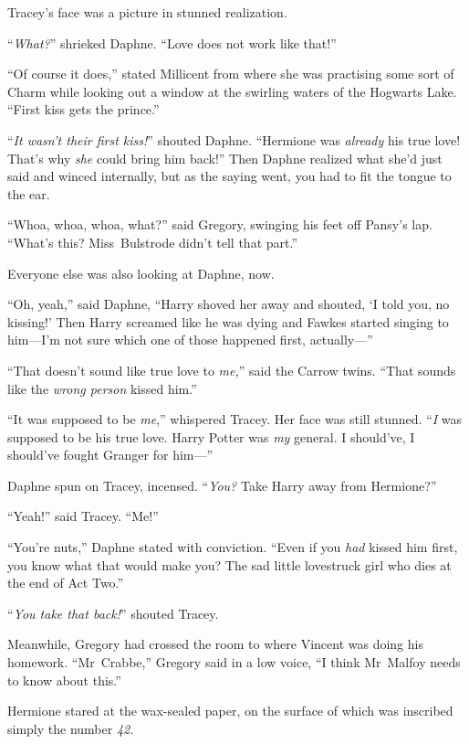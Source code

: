 Tracey’s face was a picture in stunned realization.

“\emph{What?}” shrieked Daphne. “Love does not work like that!”

“Of course it does,” stated Millicent from where she was practising some sort of Charm while looking out a window at the swirling waters of the Hogwarts Lake. “First kiss gets the prince.”

“\emph{It wasn’t their first kiss!}” shouted Daphne. “Hermione was \emph{already} his true love! That’s why \emph{she} could bring him back!” Then Daphne realized what she’d just said and winced internally, but as the saying went, you had to fit the tongue to the ear.

“Whoa, whoa, whoa, what?” said Gregory, swinging his feet off Pansy’s lap. “What’s this? Miss~Bulstrode didn’t tell that part.”

Everyone else was also looking at Daphne, now.

“Oh, yeah,” said Daphne, “Harry shoved her away and shouted, ‘I told you, no kissing!’ Then Harry screamed like he was dying and Fawkes started singing to him—I’m not sure which one of those happened first, actually—”

“That doesn’t sound like true love to \emph{me,}” said the Carrow twins. “That sounds like the \emph{wrong person} kissed him.”

“It was supposed to be \emph{me},” whispered Tracey. Her face was still stunned. “\emph{I} was supposed to be his true love. Harry Potter was \emph{my} general. I should’ve, I should’ve fought Granger for him—”

Daphne spun on Tracey, incensed. “\emph{You?} Take Harry away from Hermione?”

“Yeah!” said Tracey. “Me!”

“You’re nuts,” Daphne stated with conviction. “Even if you \emph{had} kissed him first, you know what that would make you? The sad little lovestruck girl who dies at the end of Act Two.”

“\emph{You take that back!}” shouted Tracey.

Meanwhile, Gregory had crossed the room to where Vincent was doing his homework. “Mr~Crabbe,” Gregory said in a low voice, “I think Mr~Malfoy needs to know about this.”


Hermione stared at the wax-sealed paper, on the surface of which was inscribed simply the number \emph{42.}

